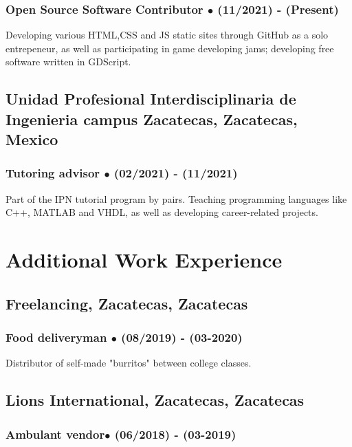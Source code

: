 \documentclass{article}
\begin{document}
  \subsubsection{Open Source Software Contributor $\bullet$ (11/2021) - (Present)}

  Developing various HTML,CSS and JS static sites through GitHub as a solo entrepeneur, as well as participating in game developing jams; developing free software written in GDScript.

  \subsection{Unidad Profesional Interdisciplinaria de Ingenieria campus Zacatecas, Zacatecas, Mexico}

  \subsubsection{Tutoring advisor $\bullet$ (02/2021) - (11/2021)}

  Part of the IPN tutorial program by pairs. Teaching programming languages like C++, MATLAB and VHDL, as well as developing career-related projects.%


  \section{Additional Work Experience}%

  \subsection{\textbf{Freelancing}, Zacatecas, Zacatecas}

  \subsubsection{Food deliveryman $\bullet$ (08/2019) - (03-2020)}

  Distributor of self-made "burritos" between college classes.

  \subsection{\textbf{Lions International}, Zacatecas, Zacatecas}

  \subsubsection{Ambulant vendor$\bullet$ (06/2018) - (03-2019)}
\end{document}
